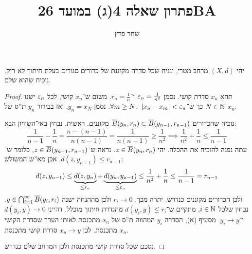 \documentclass[]{../../../../tex/classes/styledArticle}
\author{שחר פרץ}
\title{פתרון שאלה 4(ג) במועד 26BA}
\begin{document}
	\maketitle
	יהי $(X, d)$ מרחב מטרי, ונניח שכל סדרה מקוננת של כדורים סגורים בעלת חיתוך לא־ריק. נוכיח שהוא שלם. 
	
	\begin{proof}
		תהא $x_n$ סדרת קושי. נסמן $\eg_n = \frac{1}{n^{2}}$ ו־$r_n = \frac{1}{n}$. משום ש־$x_n$ קושי, לכל $\eg_n$ ישנו $N \in \mathbb{N}$ כך ש־$\forall m\ge N \co \sof{x_n - x_m} < \eg_n$. נסמן $y_n = x_N$, ואז בבירור $y_n$ ת''ס של $x_n$. 
		
		נוכיח שהכדורים $\overline B(y_n, r_n) \subset \overline B (y_{n - 1}, r_{n - 1})$ מקוננים. ראשית, נבחין באי־השוויון הבא: 
		\[ \frac{1}{n - 1} - \frac{1}{n} = \frac{n - (n - 1)}{n(n - 1)} = \frac{1}{n(n - 1)} \ge \frac{1}{n^{2}} \implies \frac{1}{n^{2}} + \frac{1}{n} \le \frac{1}{n - 1} \]
		עתה נפנה להוכיח את ההכלה. יהי $z \in \overline B(y_n, r_n)$. נראה ש־$z \in \overline B(y_{n - 1}, r_{n - 1})$, כלומר ש־$d(z, y_{n - 1}) \le r_{n - 1}$. אכן מא''ש המשולש: 
		\[ d(z, y_{n - 1}) \le \underbrace{d(z, y_n)}_{\le r_n} + \underbrace{d(y_n, y_{n - 1})}_{\le \eg_n} \le \frac{1}{n^{2}} + \frac{1}{n} \le \frac{1}{n- 1} = r_{n - 1} \]
		ולכן הכדורים מקוננים כנדרש. יתרה מכך, $r_i \to 0$ ולכן מההנחה ישנה $y \in \bigcap_{i = 1}^{\infty}\overline B(y_i, r_i)$. נבחין שלכל $i \in \mathbb{N}$, מתקיים ש־$d(y_i, y) \le r_i$ מהגדרת חיתוך מוכלל. דהיינו $d(y_i, y) \to 0$ ו־$y_i \to y$. מסעיף (א), הסדרה $y_i$ המהווה ת''ס של $x_n$ מתכנסת לאותו הערך שסדרת הקושי $x_n$ מתכנסת. לכן $x_n \to y$ סדרת קושי מתכנסת. 
		
		נסכם שכל סדרת קושי מתכנסת ולכן המרחב שלם כנדרש. 
	\end{proof}
	
	
	
	
	\ndoc
\end{document}
